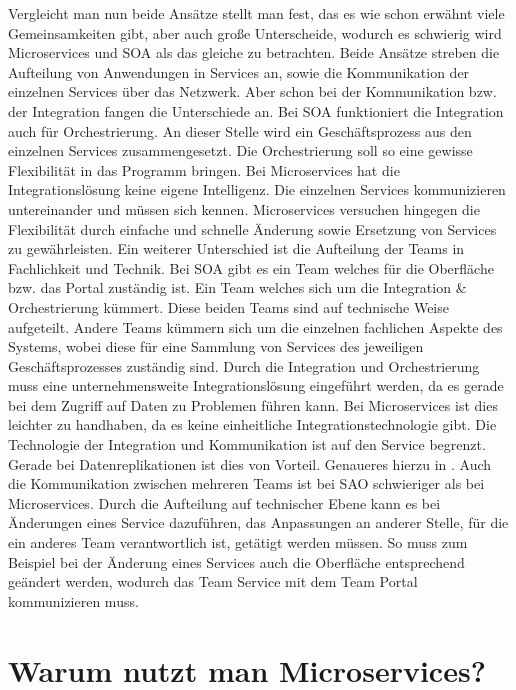 Vergleicht man nun beide Ansätze stellt man fest, das es wie schon erwähnt viele Gemeinsamkeiten gibt, aber auch große Unterscheide, wodurch es schwierig wird Microservices und SOA als das gleiche zu betrachten.\newline
Beide Ansätze streben die Aufteilung von Anwendungen in Services an, sowie die Kommunikation der einzelnen Services über das Netzwerk.\newline
Aber schon bei der Kommunikation bzw. der Integration fangen die Unterschiede an. Bei SOA funktioniert die Integration auch für Orchestrierung. An dieser Stelle wird ein Geschäftsprozess aus den einzelnen Services zusammengesetzt. Die Orchestrierung soll so eine gewisse Flexibilität in das Programm bringen. Bei Microservices hat die Integrationslösung keine eigene Intelligenz. Die einzelnen Services kommunizieren untereinander und müssen sich kennen. Microservices versuchen hingegen die Flexibilität durch einfache und schnelle Änderung sowie Ersetzung von Services zu gewährleisten.\newline
Ein weiterer Unterschied ist die Aufteilung der Teams in Fachlichkeit und Technik.
Bei SOA gibt es ein Team welches für die Oberfläche bzw. das Portal zuständig ist. Ein Team welches sich um die Integration \& Orchestrierung kümmert. Diese beiden Teams sind auf technische Weise aufgeteilt. Andere Teams kümmern sich um die einzelnen fachlichen Aspekte des Systems, wobei diese für eine Sammlung von Services des jeweiligen Geschäftsprozesses zuständig sind. Durch die Integration und Orchestrierung muss eine unternehmensweite Integrationslösung eingeführt werden, da es gerade bei dem Zugriff auf Daten zu Problemen führen kann. Bei Microservices ist dies leichter zu handhaben, da es keine einheitliche Integrationstechnologie gibt. Die Technologie der Integration und Kommunikation ist auf den Service begrenzt. Gerade bei Datenreplikationen ist dies von Vorteil. Genaueres hierzu in .\newline
Auch die Kommunikation zwischen mehreren Teams ist bei SAO schwieriger als bei Microservices. Durch die Aufteilung auf technischer Ebene kann es bei Änderungen eines Service dazuführen, das Anpassungen an anderer Stelle, für die ein anderes Team verantwortlich ist, getätigt werden müssen. So muss zum Beispiel bei der Änderung eines Services auch die Oberfläche entsprechend geändert werden, wodurch das Team Service mit dem Team Portal kommunizieren muss.\cite{microservices}

\chapter{Warum nutzt man Microservices?}

